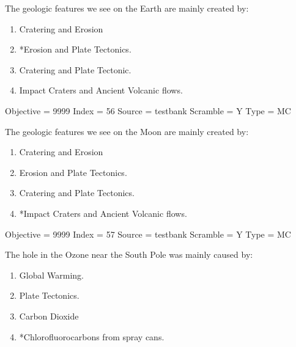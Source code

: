\documentclass[11pt]{article}
\begin{document}
\begin{enumerate}
\begin{minipage}{\textwidth}
\begin{minipage}{\textwidth}
\item The geologic features we see on the Earth are mainly created by:
\begin{enumerate} 
\setlength{\itemsep}{1pt} 
\setlength{\parskip}{0pt} 
\setlength{\parsep}{0pt}
\setlength{\multicolsep}{1pt} 
\item Cratering and Erosion
\item *Erosion and Plate Tectonics.
\item Cratering and Plate Tectonic.
\item Impact Craters and Ancient Volcanic flows.
\end{enumerate} 
Objective = 9999
Index = 56
Source = testbank
Scramble = Y
Type = MC
\end{minipage}
\end{minipage}
\vskip 0.20in

\begin{minipage}{\textwidth}
\begin{minipage}{\textwidth}
\item The geologic features we see on the Moon are mainly created by:
\begin{enumerate} 
\setlength{\itemsep}{1pt} 
\setlength{\parskip}{0pt} 
\setlength{\parsep}{0pt}
\setlength{\multicolsep}{1pt} 
\item Cratering and Erosion
\item Erosion and Plate   Tectonics.
\item Cratering and Plate Tectonics.
\item *Impact Craters and Ancient Volcanic flows.
\end{enumerate} 
Objective = 9999
Index = 57
Source = testbank
Scramble = Y
Type = MC
\end{minipage}
\end{minipage}
\vskip 0.20in

\begin{minipage}{\textwidth}
\begin{minipage}{\textwidth}
\item The hole in the Ozone near the South Pole was mainly caused by:
\begin{multicols}{2}
\begin{enumerate} 
\setlength{\itemsep}{1pt} 
\setlength{\parskip}{0pt} 
\setlength{\parsep}{0pt}
\setlength{\multicolsep}{1pt} 
\item Global Warming.
\item Plate Tectonics.
\item Carbon Dioxide
\item *Chlorofluorocarbons from spray cans.
\end{enumerate} 
\vfill 
\end{multicols}


\end{minipage}
\end{minipage}
\end{enumerate}
\end{document}

